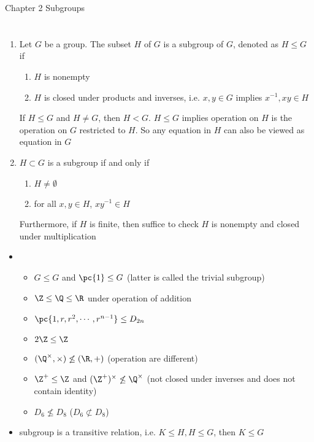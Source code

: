 \documentclass[11pt]{article}
\begin{document}
\begin{center}
    {\Huge Chapter 2 Subgroups}
\end{center}
\tableofcontents
\newpage


\section{}


\begin{definition*}
    \begin{enumerate}
        \item {} Let $G$ be a group. The subset $H$ of $G$ is a subgroup of $G$, denoted as $H\leq G$ if
        \begin{enumerate}
            \item $H$ is nonempty
            \item $H$ is closed under products and inverses, i.e. $x,y\in G$ implies $x^{-1},xy\in H$
        \end{enumerate}
        If $H\leq G$ and $H\neq G$, then $H < G$. $H\leq G$ implies operation on $H$ is the operation on $G$ restricted to $H$. So any equation in $H$ can also be viewed as equation in $G$
        \item {} $H \subset G$ is a subgroup if and only if
        \begin{enumerate}
            \item $H\neq \emptyset$
            \item for all $x,y\in H$, $xy^{-1} \in H$
        \end{enumerate}
        Furthermore, if $H$ is finite, then suffice to check $H$ is nonempty and closed under multiplication
    \end{enumerate}
    \begin{itemize}
        \item {}
        \begin{itemize}
            \item $G\leq G$ and $\pc{1}\leq G$ (latter is called the trivial subgroup)
            \item $\Z \leq \Q \leq \R$ under operation of addition 
            \item $\pc{1,r,r^2,\cdots,r^{n-1}} \leq D_{2n}$
            \item $2\Z \leq \Z$
            \item $(\Q^{\times}, \times) \not\leq (\R, +)$ (operation are different)
            \item $\Z^+ \leq \Z$ and $(\Z^+)^{\times} \not\leq \Q^{\times}$ (not closed under inverses and does not contain identity)
            \item $D_6 \not\leq D_8$ ($D_6 \not\subset D_8$)
        \end{itemize}
        \item {} subgroup is a transitive relation, i.e. $K\leq H, H\leq G$, then $K\leq G$ 
    \end{itemize}
\end{definition*}
 
\end{document}
